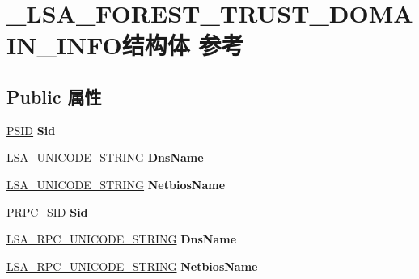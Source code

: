\hypertarget{struct___l_s_a___f_o_r_e_s_t___t_r_u_s_t___d_o_m_a_i_n___i_n_f_o}{}\section{\+\_\+\+L\+S\+A\+\_\+\+F\+O\+R\+E\+S\+T\+\_\+\+T\+R\+U\+S\+T\+\_\+\+D\+O\+M\+A\+I\+N\+\_\+\+I\+N\+F\+O结构体 参考}
\label{struct___l_s_a___f_o_r_e_s_t___t_r_u_s_t___d_o_m_a_i_n___i_n_f_o}
\subsection*{Public 属性}
\begin{DoxyCompactItemize}
\item 
\mbox{\label{struct___l_s_a___f_o_r_e_s_t___t_r_u_s_t___d_o_m_a_i_n___i_n_f_o_a1b3a841ce439834e6df94ffc0481d277}} 
\hyperlink{struct___s_i_d}{P\+S\+ID} {\bfseries Sid}
\item 
\mbox{\label{struct___l_s_a___f_o_r_e_s_t___t_r_u_s_t___d_o_m_a_i_n___i_n_f_o_ace8481da86e91f3beac3bd9cbbd1eb3a}} 
\hyperlink{struct___l_s_a___u_n_i_c_o_d_e___s_t_r_i_n_g}{L\+S\+A\+\_\+\+U\+N\+I\+C\+O\+D\+E\+\_\+\+S\+T\+R\+I\+NG} {\bfseries Dns\+Name}
\item 
\mbox{\label{struct___l_s_a___f_o_r_e_s_t___t_r_u_s_t___d_o_m_a_i_n___i_n_f_o_a5fad947a2bedbeb43d382dcdc567d7a7}} 
\hyperlink{struct___l_s_a___u_n_i_c_o_d_e___s_t_r_i_n_g}{L\+S\+A\+\_\+\+U\+N\+I\+C\+O\+D\+E\+\_\+\+S\+T\+R\+I\+NG} {\bfseries Netbios\+Name}
\item 
\mbox{\label{struct___l_s_a___f_o_r_e_s_t___t_r_u_s_t___d_o_m_a_i_n___i_n_f_o_a1b3a841ce439834e6df94ffc0481d277}} 
\hyperlink{struct___r_p_c___s_i_d}{P\+R\+P\+C\+\_\+\+S\+ID} {\bfseries Sid}
\item 
\mbox{\label{struct___l_s_a___f_o_r_e_s_t___t_r_u_s_t___d_o_m_a_i_n___i_n_f_o_ab12aad8ba5fcdcf1cfacb03d42ebb997}} 
\hyperlink{struct___r_p_c___u_n_i_c_o_d_e___s_t_r_i_n_g}{L\+S\+A\+\_\+\+R\+P\+C\+\_\+\+U\+N\+I\+C\+O\+D\+E\+\_\+\+S\+T\+R\+I\+NG} {\bfseries Dns\+Name}
\item 
\mbox{\label{struct___l_s_a___f_o_r_e_s_t___t_r_u_s_t___d_o_m_a_i_n___i_n_f_o_a52529bdf1a148b909ee360ed7baabcb2}} 
\hyperlink{struct___r_p_c___u_n_i_c_o_d_e___s_t_r_i_n_g}{L\+S\+A\+\_\+\+R\+P\+C\+\_\+\+U\+N\+I\+C\+O\+D\+E\+\_\+\+S\+T\+R\+I\+NG} {\bfseries Netbios\+Name}
\end{DoxyCompactItemize}


